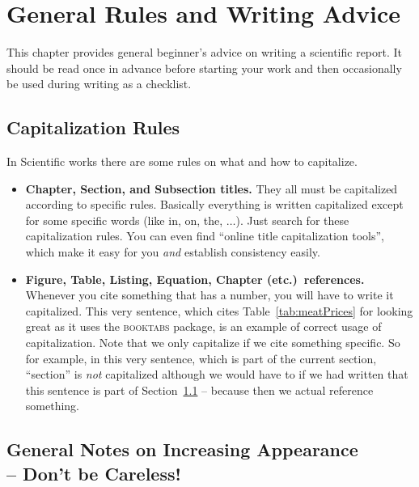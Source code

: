 \chapter{General Rules and Writing Advice}\label{chap:abstractAdvice}

This chapter provides general beginner's advice on writing a scientific report. It should be read once in advance before starting your work and then occasionally be used during writing as a checklist.


\section{Capitalization Rules}\label{sec:capitalization}

In Scientific works there are some rules on what and how to capitalize.

\begin{itemize}
  \item \textbf{Chapter, Section, and Subsection titles.} They all must be capitalized according to specific rules. Basically everything is written capitalized except for some specific words (like in, on, the, $\dots$). Just search for these capitalization rules. You can even find ``online title capitalization tools'', which make it easy for you \emph{and} establish consistency easily.
  \item \textbf{Figure, Table, Listing, Equation, Chapter (etc.)\ references.} Whenever you cite something that has a number, you will have to write it capitalized. This very sentence, which cites Table~\ref{tab:meatPrices} for looking great as it uses the \textsc{booktabs} package, is an example of correct usage of capitalization. Note that we only capitalize if we cite something specific. So for example, in this very sentence, which is part of the current section, ``section'' is \emph{not} capitalized although we would have to if we had written that this sentence is part of Section~\ref{sec:capitalization} -- because then we actual reference something.
\end{itemize}


\section[General Notes on Increasing Appearance -- Don't be Careless!]{General Notes on Increasing Appearance\\ -- Don't be Careless!}

